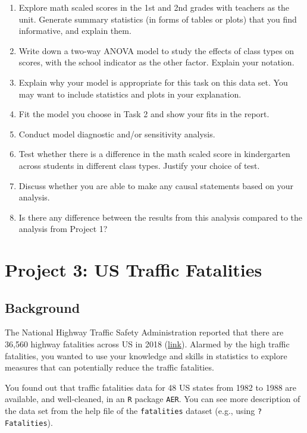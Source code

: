 \documentclass[12pt,]{book}
\providecommand{\tightlist}{%
  \setlength{\itemsep}{0pt}\setlength{\parskip}{0pt}}
\begin{document}
\begin{enumerate}
\def\labelenumi{\arabic{enumi}.}
\tightlist
\item
  Explore math scaled scores in the 1st and 2nd grades with teachers as
  the unit. Generate summary statistics (in forms of tables or plots)
  that you find informative, and explain them.
\item
  Write down a two-way ANOVA model to study the effects of class types
  on scores, with the school indicator as the other factor. Explain your
  notation.
\item
  Explain why your model is appropriate for this task on this data set.
  You may want to include statistics and plots in your explanation.
\item
  Fit the model you choose in Task 2 and show your fits in the report.
\item
  Conduct model diagnostic and/or sensitivity analysis.
\item
  Test whether there is a difference in the math scaled score in
  kindergarten across students in different class types. Justify your
  choice of test.
\item
  Discuss whether you are able to make any causal statements based on
  your analysis.
\item
  Is there any difference between the results from this analysis
  compared to the analysis from Project 1?
\end{enumerate}

\section{Project 3: US Traffic
Fatalities}\label{project-3-us-traffic-fatalities}

\subsection{Background}\label{background-2}

The National Highway Traffic Safety Administration reported that there
are 36,560 highway fatalities across US in 2018
(\href{nhtsa.gov/press-releases/roadway-fatalities-2018-fars}{link}).
Alarmed by the high traffic fatalities, you wanted to use your knowledge
and skills in statistics to explore measures that can potentially reduce
the traffic fatalities.

You found out that traffic fatalities data for 48 US states from 1982 to
1988 are available, and well-cleaned, in an \texttt{R} package
\texttt{AER}. You can see more description of the data set from the help
file of the \texttt{fatalities} dataset (e.g., using
\texttt{?Fatalities}).
\end{document}
